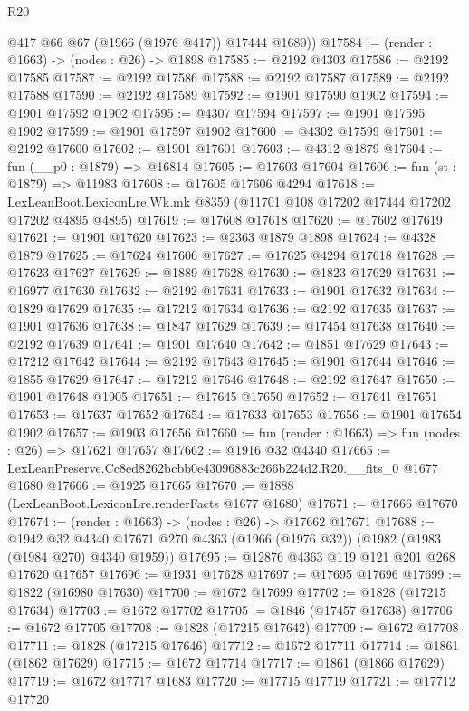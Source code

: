 \begin{lexlean}{R20}
\begin{coremodule}
        @417
        @66
        @67
        (@1966 (@1976 @417))
        @17444
        @1680))
@17584 := (render : @1663) -> (nodes : @26) -> @1898
@17585 := @2192 @4303
@17586 := @2192 @17585
@17587 := @2192 @17586
@17588 := @2192 @17587
@17589 := @2192 @17588
@17590 := @2192 @17589
@17592 := @1901 @17590 @1902
@17594 := @1901 @17592 @1902
@17595 := @4307 @17594
@17597 := @1901 @17595 @1902
@17599 := @1901 @17597 @1902
@17600 := @4302 @17599
@17601 := @2192 @17600
@17602 := @1901 @17601
@17603 := @4312 @1879
@17604 := fun (__p0 : @1879) => @16814
@17605 := @17603 @17604
@17606 := fun (st : @1879) => @11983
@17608 := @17605 @17606 @4294
@17618 := LexLeanBoot.LexiconLre.Wk.mk @8359 (@11701 @108 @17202 @17444 @17202 @17202 @4895 @4895)
@17619 := @17608 @17618
@17620 := @17602 @17619
@17621 := @1901 @17620
@17623 := @2363 @1879 @1898
@17624 := @4328 @1879
@17625 := @17624 @17606
@17627 := @17625 @4294 @17618
@17628 := @17623 @17627
@17629 := @1889 @17628
@17630 := @1823 @17629
@17631 := @16977 @17630
@17632 := @2192 @17631
@17633 := @1901 @17632
@17634 := @1829 @17629
@17635 := @17212 @17634
@17636 := @2192 @17635
@17637 := @1901 @17636
@17638 := @1847 @17629
@17639 := @17454 @17638
@17640 := @2192 @17639
@17641 := @1901 @17640
@17642 := @1851 @17629
@17643 := @17212 @17642
@17644 := @2192 @17643
@17645 := @1901 @17644
@17646 := @1855 @17629
@17647 := @17212 @17646
@17648 := @2192 @17647
@17650 := @1901 @17648 @1905
@17651 := @17645 @17650
@17652 := @17641 @17651
@17653 := @17637 @17652
@17654 := @17633 @17653
@17656 := @1901 @17654 @1902
@17657 := @1903 @17656
@17660 := fun (render : @1663) => fun (nodes : @26) => @17621 @17657
@17662 := @1916 @32 @4340
@17665 := LexLeanPreserve.Cc8ed8262bcbb0e43096883c266b224d2.R20.__fits_0 @1677 @1680
@17666 := @1925 @17665
@17670 := @1888 (LexLeanBoot.LexiconLre.renderFacts @1677 @1680)
@17671 := @17666 @17670
@17674 := (render : @1663) -> (nodes : @26) -> @17662 @17671
@17688 := @1942
    @32
    @4340
    @17671
    @270
    @4363
    (@1966 (@1976 @32))
    (@1982 (@1983 (@1984 @270) @4340 @1959))
@17695 := @12876 @4363 @119 @121 @201 @268 @17620 @17657
@17696 := @1931 @17628
@17697 := @17695 @17696
@17699 := @1822 (@16980 @17630)
@17700 := @1672 @17699
@17702 := @1828 (@17215 @17634)
@17703 := @1672 @17702
@17705 := @1846 (@17457 @17638)
@17706 := @1672 @17705
@17708 := @1828 (@17215 @17642)
@17709 := @1672 @17708
@17711 := @1828 (@17215 @17646)
@17712 := @1672 @17711
@17714 := @1861 (@1862 @17629)
@17715 := @1672 @17714
@17717 := @1861 (@1866 @17629)
@17719 := @1672 @17717 @1683
@17720 := @17715 @17719
@17721 := @17712 @17720

\end{coremodule}
\end{lexlean}
